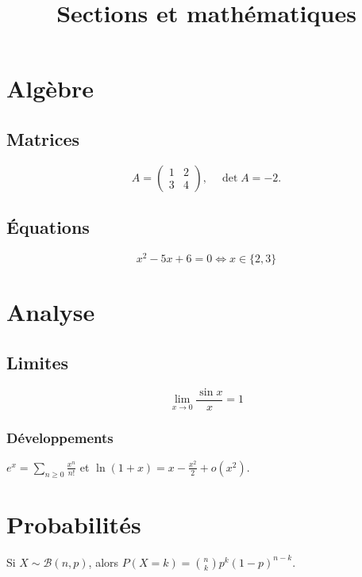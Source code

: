 \documentclass{article}
\begin{document}
\title{Sections et mathématiques}
\section{Algèbre}
\subsection{Matrices}
\[ A=\begin{pmatrix}1&2\\3&4\end{pmatrix},\quad \det A=-2. \]
\subsection{Équations}
\begin{equation}
x^2-5x+6=0 \iff x\in\{2,3\}
\end{equation}
\section{Analyse}
\subsection{Limites}
\[ \lim_{x\to 0}\frac{\sin x}{x}=1 \]
\subsubsection{Développements}
\(e^x = \sum_{n\geq 0} \frac{x^n}{n!}\) et \(\ln(1+x)=x-\frac{x^2}{2}+o(x^2)\).
\section{Probabilités}
Si \(X\sim\mathcal{B}(n,p)\), alors \(P(X=k)=\binom{n}{k}p^k(1-p)^{n-k}\).
\end{document}
